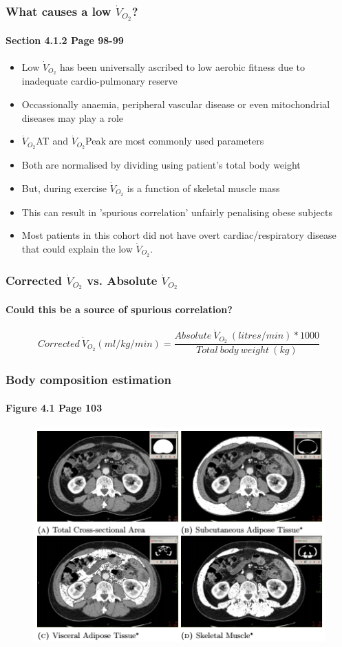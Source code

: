 \documentclass[10pt]{beamer}
\begin{document}
\begin{frame}
	\frametitle{What causes a low $\dot{V}_{O_2}$? }
	\framesubtitle{Section 4.1.2 Page 98-99 }
	\begin{itemize}
		\item Low $\dot{V}_{O_2}$ has been universally ascribed to low aerobic fitness due to inadequate cardio-pulmonary reserve
		\item Occassionally anaemia, peripheral vascular disease or even mitochondrial diseases may play a role
		\item $\dot{V}_{O_2}$AT and $\dot{V}_{O_2}$Peak are most commonly used parameters
		\item Both are normalised by dividing using patient's total body weight
		\item But, during exercise $\dot{V}_{O_2}$ is a function of skeletal muscle mass
		\item This can result in 'spurious correlation' unfairly penalising obese subjects
		\item Most patients in this cohort did not have overt cardiac/respiratory disease that could explain the low $\dot{V}_{O_2}$.
	\end{itemize}
\end{frame}

\begin{frame}
	\frametitle{Corrected $\dot{V}_{O_2}$ vs. Absolute $\dot{V}_{O_2}$}
	\framesubtitle{Could this be a source of spurious correlation?}
	\[Corrected\ \dot{V}_{O_2} (ml/kg/min) = \frac{Absolute\ \dot{V}_{O_2}\ (litres/min) * 1000}{Total\ body\ weight\ (kg)}\]

\end{frame}

\begin{frame}
	\frametitle{Body composition estimation}
	\framesubtitle{Figure 4.1 Page 103}
	\begin{figure}
		\centering
		\includegraphics[width=\linewidth]{bc_gimp}
		\label{fig:bc_gimp}
	\end{figure}
\end{frame}
\end{document}
